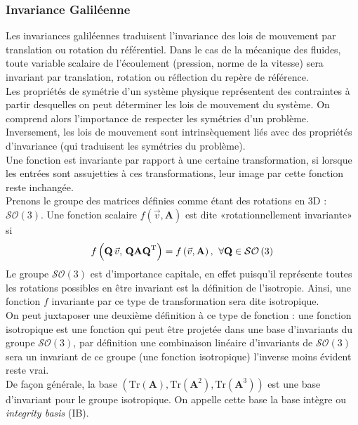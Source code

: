 \documentclass[a4paper,12pt]{report}
\newcommand{\rap}{par rapport}
\numberwithin{equation}{section} %
\begin{document}
\subsubsection{Invariance Galiléenne}
\noindent Les invariances galiléennes traduisent l'invariance des lois de mouvement par translation ou rotation du référentiel. Dans le cas de la mécanique des fluides, toute variable scalaire de l'écoulement (pression, norme de la vitesse) sera invariant par translation, rotation ou réflection du repère de référence.\\

\noindent Les propriétés de symétrie d'un système physique représentent des contraintes à partir desquelles on peut déterminer les lois de mouvement du système. On comprend alors l'importance de respecter les symétries d'un problème. Inversement, les lois de mouvement sont intrinsèquement liés avec des propriétés d'invariance (qui traduisent les symétries du problème).\\

Une fonction est invariante \rap $ $ à une certaine transformation, si lorsque les entrées sont assujetties à ces transformations, leur image par cette fonction reste inchangée.\\
Prenons le groupe des matrices définies comme étant des rotations en 3D : $\mathcal{SO} \left( 3 \right)$. 
Une fonction scalaire $f\left(\vec{v}, \textbf{A} \right)$ est dite «rotationnellement invariante» si 
\begin{equation*}
f\left( \textbf{Q}\,\vec{v}, \, \textbf{Q} \textbf{A} \textbf{Q}^{\text{T}}\right) = f\left (\vec{v}, \mathbf{A} \right) \text{,\hspace{2mm}} \forall \textbf{Q} \in \mathcal{SO}\left ( 3\right )  
\end{equation*}
Le groupe $\mathcal{SO} \left( 3 \right)$ est d'importance capitale, en effet puisqu'il représente toutes les rotations possibles en être invariant est la définition de l'isotropie. Ainsi, une fonction $f$ invariante par ce type de transformation sera dite isotropique.\\
On peut juxtaposer une deuxième définition à ce type de fonction : une fonction isotropique est une fonction qui peut être projetée dans une base d'invariants du groupe $\mathcal{SO} \left( 3 \right)$, par définition une combinaison linéaire d'invariants de $\mathcal{SO} \left( 3 \right)$ sera un invariant de ce groupe (une fonction isotropique) l'inverse moins évident reste vrai.\\
De façon générale, la base $\left( \text{Tr}\left( \mathbf{A}\right), \text{Tr}\left( \mathbf{A}^2\right), \text{Tr}\left( \mathbf{A}^3\right) \right ) $ est une base d'invariant pour le groupe isotropique. On appelle cette base la base intègre ou \textit{integrity basis} (IB). \\
\end{document}
